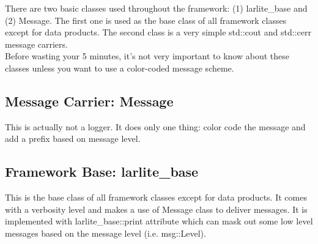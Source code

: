 
There are two basic classes used throughout the framework: 
(1) {\ttfamily larlite\_base} and (2) {\ttfamily Message}.
The first one is used as the base class of all framework classes except for data products.
The second class is a very simple {\ttfamily std::cout} and {\ttfamily std::cerr} message carriers.\\

Before wasting your 5 minutes, it's not very important to know about these classes unless you want to
use a color-coded message scheme.

\subsection{Message Carrier: {\ttfamily Message}}
This is actually not a logger.
It does only one thing: color code the message and add a prefix based on message level.

\subsection{Framework Base: {\ttfamily larlite\_base}}
This is the base class of all framework classes except for data products.
It comes with a verbosity level and makes a use of {\ttfamily Message} class
to deliver messages. It is implemented with {\ttfamily larlite\_base::print} attribute
which can mask out some low level messages based on the message level (i.e. {\ttfamily msg::Level}).


